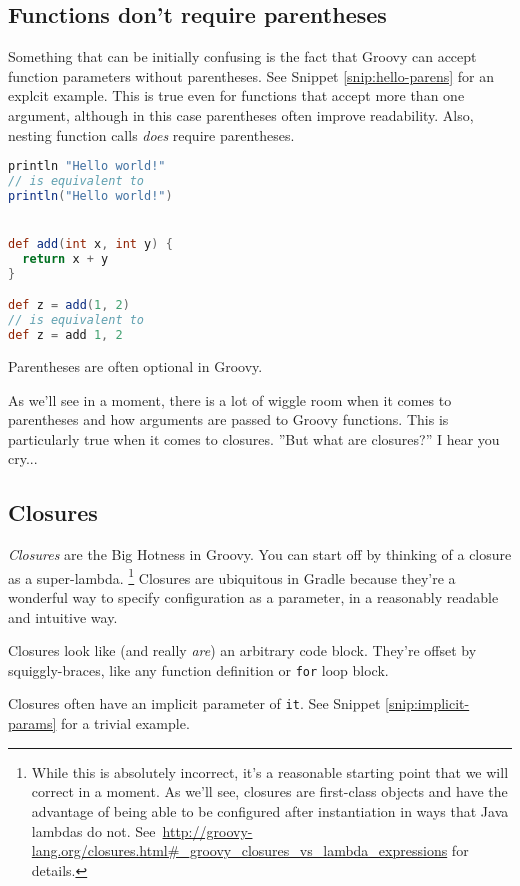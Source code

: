 \documentclass[]{article}
\theoremstyle{definition}
\newcommand{\startSnippetFig}{%
\begin{snippet}
  \begin{minipage}[c]{.9\textwidth}
    \begin{framed}
}
\newcommand{\stopSnippetFig}{%
    \end{framed}
  \end{minipage}
\end{snippet}
}
\begin{document}
\subsection{Functions don't require parentheses}

Something that can be initially confusing is the fact that Groovy can accept function parameters
  without parentheses.
See Snippet \ref{snip:hello-parens} for an explcit example.
This is true even for functions that accept more than one argument,
  although in this case parentheses often improve readability.
Also, nesting function calls \emph{does} require parentheses.


\startSnippetFig
\begin{lstlisting}[language=Groovy]
println "Hello world!"
// is equivalent to
println("Hello world!")


def add(int x, int y) {
  return x + y
}

def z = add(1, 2)
// is equivalent to
def z = add 1, 2
\end{lstlisting}
\caption{Parentheses are often optional in Groovy.}
\label{snip:hello-parens}
\stopSnippetFig

As we'll see in a moment, there is a lot of wiggle room when it comes to parentheses
  and how arguments are passed to Groovy functions.
This is particularly true when it comes to closures.
''But what are closures?'' I hear you cry...

\subsection{Closures}
\textit{Closures} are the Big Hotness in Groovy.
You can start off by thinking of a closure as a super-lambda.%
\footnote{While this is absolutely incorrect, it's a reasonable starting point that we will correct in a moment.
  As we'll see, closures are first-class objects and have the advantage of being able to be configured after instantiation in ways that Java lambdas do not.
  See\ \url{http://groovy-lang.org/closures.html\#\_groovy_closures_vs_lambda_expressions} for details.}
Closures are ubiquitous in Gradle because they're a wonderful way to specify configuration as a parameter, in a reasonably readable and intuitive way.

Closures look like (and really \emph{are}) an arbitrary code block.
They're offset by squiggly-braces, like any function definition or \texttt{for} loop block.

Closures often have an implicit parameter of \texttt{it}.
See Snippet \ref{snip:implicit-params} for a trivial example.
\end{document}
